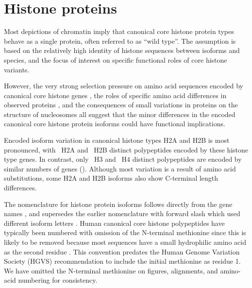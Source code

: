 \section{Histone proteins}
  Most depictions of chromatin imply that
  canonical core histone protein types behave as a single protein,
  often referred to as ``wild type''.
  The assumption is based on the relatively high identity of histone sequences
  between isoforms and species,
  and the focus of interest on specific functional roles of core histone variants.

  However, the very strong selection pressure on 
  amino acid sequences encoded by canonical core histone genes \citep{NeiRooney2005},
  the roles of specific amino acid differences in observed proteins \citep{MazeAllis2014},
  and the consequences of small variations in proteins on the structure of nucleosomes \citep{KurumizakaCOSB2013}
  all suggest that the minor differences in the encoded canonical core histone protein isoforms
  could have functional implications.

  Encoded isoform variation in canonical histone types H2A and H2B is most pronounced,
  with \HTwoAUniqueProteins{}~H2A and \HTwoBUniqueProteins{}~H2B distinct polypeptides
  encoded by these histone type genes.
  In contrast, only \HThreeUniqueProteins{}~H3 and \HFourUniqueProteins{}~H4
  distinct polypeptides are encoded by similar numbers of genes ().
  Although most variation is a result of amino acid substitutions,
  some H2A and H2B isoforms also show C-terminal length differences.

  The nomenclature for histone protein isoforms follows directly
  from the gene names \citep{Marzluff02},
  and supersedes the earlier nomenclature with forward slash which used different isoform letters
  \citep{AlbigGenomics1997,AlbigHumangen1997}.
  Human canonical core histone polypeptides have typically been numbered
  with omission of the N-terminal methionine
  since this is likely to be removed because most sequences have
  a small hydrophilic amino acid as the second residue \citep{XiaoPeiBiochem2010}.
  This convention predates the Human Genome Variation Society (HGVS) recommendation
  to include the initial methionine as residue 1.
  We have omitted the N-terminal methionine on figures, alignments,
  and amino-acid numbering for consistency.



